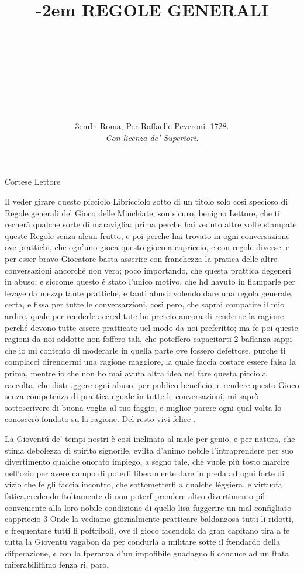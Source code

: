 \documentclass[12pt,a6paper]{article}
\title{\kern -2em
{\huge REGOLE GENERALI}\\
\textls[120]{\Large Del Nobilissimo Gioco}\\
\textls[1000]{\normalsize DELLE}\\
\fontsize{34}{34}\selectfont{\textls[100]{MINCHIATE}}}
\author{%
  \vspace{-26pt}\\
\textls[122]{Con un modo breve, e facile}\\
\textls[44]{per ben imparare a giocarlo.}\\}
\date{%
\vfill
  \kern 3em\small In Roma, Per Raffaelle Peveroni. 1728.\\ \sepline
  \textit{Con licenza de’ Superiori.}}
\begin{document}

\maketitle
 

 


 

 

 
Cortese Lettore

Il veder girare questo
picciolo Libricciolo sotto di un
titolo solo così specioso di
Regole generali del Gioco
delle Minchiate, son sicuro,
benigno Lettore, che ti recherà
qualche sorte di maraviglia:
prima perche hai veduto altre
volte stampate queste Regole
senza alcun frutto, e poi perche
hai trovato in ogni conversazione
ove prattichi, che ogn'uno
gioca questo gioco a capriccio,
e con regole diverse, e per
esser bravo Giocatore basta
asserire con franchezza la
pratica delle altre conversazioni
ancorché non vera; poco importando,
che questa prattica degeneri
in abuso; e siccome questo
é stato l'unico motivo, che hd
havuto in flamparle per levaye
da mezzp tante prattiche, e
tanti abusi: volendo dare una
regola generale, certa, e fissa
per tutte le conversarzioni, così
pero, che saprai compatire il
mio ardire, quale per renderle
accreditate bo pretefo ancora
di renderne la ragione, perché
devono tutte essere pratticate
uel modo da noi prefcritto; ma
fe poi queste ragioni da noi
addotte non foffero tali, che
poteffero capacitarti 2 baflanza
sappi che io mi contento
di moderarle in quella parte 
ove fossero defettose, purche ti
complacci direndermi una ragione
maggiore, la quale faccia
costare essere falsa la prima,
mentre io che non ho mai avuta
altra idea nel fare questa
picciola raccolta, che distruggere
ogni abuso, per publico beneficio,
e rendere questo Gioco senza
competenza di prattica eguale
in tutte le conversazioni, mi
saprò sottoscrivere di buona
voglia al tuo faggio, e miglior
parere ogni qual volta lo
conoscerò fondato su la ragione. Del
resto vivi felice .

La Gioventú de' tempi
nostri è così inclinata
al male per genio, e
per natura, che stima
debolezza di spirito signorile,
evilta d’animo nobile
l'intraprendere per suo divertimento
qualche onorato impiego, a segno
tale, che vuole più tosto
marcire nell'ozio per avere
campo di poterfi liberamente
dare in preda ad ogni forte di
vizio che fe gli faccia incontro,
che sottometterfi a qualche léggiera, e virtuofa fatica,credendo ftoltamente di non poterf
prendere altro divertimento
pil conveniente alla loro nobile
condizione di quello lisa fuggerire
un mal configliato cappriccio 3
Onde la vediamo giornalmente
pratticare baldanzosa
tutti li ridotti, e frequentare
tutti li poftriboli, ove il gioco
facendola da gran capitano tira
a fe tutta la Gioventu vagabon
da per condurla a militare sotte
il ftendardo della difperazione,
¢ con la fperanza d’un impofibile guadagno li conduce ad un
ftata miferabiliflimo fenza ri.
paro.
\end{document}
